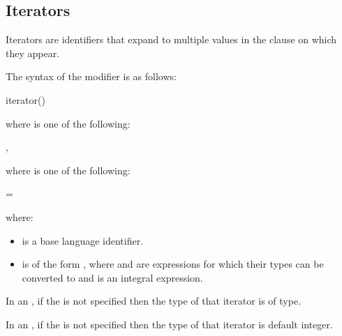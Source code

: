 \subsection{Iterators}
\label{subsec:iterators}

Iterators are identifiers that expand to multiple values in the clause on which 
they appear.

The syntax of the  modifier is as follows:
\begin{ompSyntax}
iterator()
\end{ompSyntax}

where  is one of the following:
\begin{indentedcodelist}
\plc{iterator-specifier [}, \plc{iterators-definition ]}
\end{indentedcodelist}

where  is one of the following:
\begin{indentedcodelist}
  = 
\end{indentedcodelist}

where:
\begin{itemize}
\item {} is a base language identifier.


\item {} is of the form 
\code{:}\plc{end[}\code{:}\plc{step]}, where  and 
 are expressions for which their types can be converted to 
 and  is an integral expression.
\end{itemize}

\begin{ccppspecific}
In an , if the  is not specified then the type of that iterator is of  type.
\end{ccppspecific}

\begin{fortranspecific}
In an , if the  is not specified then the type of that iterator is default integer.
\end{fortranspecific}

